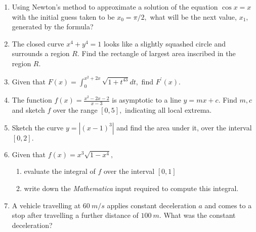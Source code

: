 \documentclass[11pt]{article}
\begin{document}
\vspace{0.5cm}


\begin{enumerate}

\item Using Newton's method
to approximate a solution of the equation $\cos x = x$ with the
initial guess  taken to be $x_0 = \pi/2,$ what will be the next value, $x_1,$ generated by the formula?



\newpage



\item The closed curve $\displaystyle{x^4+y^4=1}$ looks like a slightly squashed circle and surrounds a region $R.$ Find the rectangle of largest area  inscribed in the region $R.$

\vspace{5in}


\item Given that $\displaystyle{F(x) = \int_0^{x^2+2x} \sqrt{1 + t^{43}} dt},$ find $F^\prime (x).$




\newpage



\item The function $\displaystyle{f(x)=\frac{x^2-2x-2}{x-3} }$ is asymptotic to a line $\displaystyle{y=mx+c}.$ Find $m,c$ and sketch $f$ over the range
$[0,5],$ indicating all local extrema.



\vspace{4in}



\item Sketch the curve $\displaystyle{y=|(x-1)^3|}$ and find the area under it, over the interval $[0,2].$



\newpage



\item Given that $\displaystyle{f(x)= x^3\sqrt{1-x^4}},$
\begin{enumerate}
\item evaluate the integral of $f$ over the interval $[0,1]$
\vspace{3.5in}
\item write down the {\em Mathematica} input required to compute this integral.
\end{enumerate}


\vspace{0.5in}



\item A vehicle travelling at $60 \ m/s$ applies constant deceleration $a$ and comes to a stop after travelling a further distance of $100 \ m.$ What was the constant deceleration?



\end{enumerate}
\end{document}
